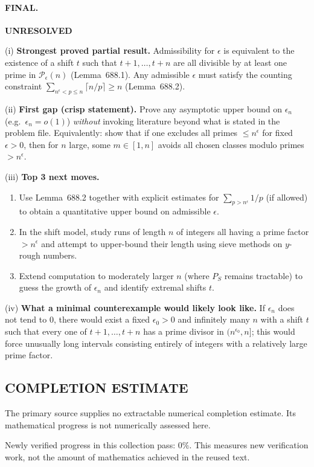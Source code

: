 \paragraph{FINAL.}
\noindent\textbf{UNRESOLVED}

\smallskip
\noindent(i) \textbf{Strongest proved partial result.}
Admissibility for $\epsilon$ is equivalent to the existence of a shift $t$ such that $t+1,\dots,t+n$ are all divisible by at least one prime in
$\mathcal P_\epsilon(n)$ (Lemma~688.1). Any admissible $\epsilon$ must satisfy the counting constraint
$\sum_{n^\epsilon<p\le n}\lceil n/p\rceil\ge n$ (Lemma~688.2).

\smallskip
\noindent(ii) \textbf{First gap (crisp statement).}
Prove any asymptotic upper bound on $\epsilon_n$ (e.g.\ $\epsilon_n=o(1)$) \emph{without} invoking literature beyond what is stated in the problem file.
Equivalently: show that if one excludes all primes $\le n^\epsilon$ for fixed $\epsilon>0$, then for $n$ large, some $m\in[1,n]$ avoids all chosen
classes modulo primes $>n^\epsilon$.

\smallskip
\noindent(iii) \textbf{Top 3 next moves.}
\begin{enumerate}
\item Use Lemma~688.2 together with explicit estimates for $\sum_{p>n^\epsilon}1/p$ (if allowed) to obtain a quantitative upper bound on admissible $\epsilon$.
\item In the shift model, study runs of length $n$ of integers all having a prime factor $>n^\epsilon$ and attempt to upper-bound their length using
sieve methods on $y$-rough numbers.
\item Extend computation to moderately larger $n$ (where $P_S$ remains tractable) to guess the growth of $\epsilon_n$ and identify extremal shifts $t$.
\end{enumerate}

\smallskip
\noindent(iv) \textbf{What a minimal counterexample would likely look like.}
If $\epsilon_n$ does not tend to $0$, there would exist a fixed $\epsilon_0>0$ and infinitely many $n$ with a shift $t$ such that every one of
$t+1,\dots,t+n$ has a prime divisor in $(n^{\epsilon_0},n]$; this would force unusually long intervals consisting entirely of integers with a relatively large
prime factor.




\subsection*{COMPLETION ESTIMATE}
The primary source supplies no extractable numerical completion estimate. Its mathematical progress is not numerically assessed here.

Newly verified progress in this collection pass: $0\%$. This measures new verification work, not the amount of mathematics achieved in the reused text.
